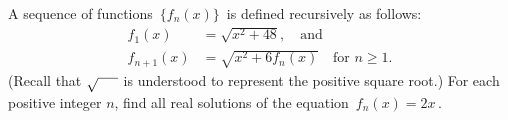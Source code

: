 A sequence of functions $\, \{f_n(x) \} \,$ is defined recursively as follows: \begin{align*}f_1(x) &= \sqrt{x^2 + 48}, \quad \mbox{and} \\ f_{n+1}(x) &= \sqrt{x^2 + 6f_n(x)} \quad \mbox{for } n \geq 1.\end{align*}(Recall that $\sqrt{\makebox[5mm]{}}$ is understood to represent the positive square root.) For each positive integer $n$,  find all real solutions of the equation $\, f_n(x) = 2x \,$.